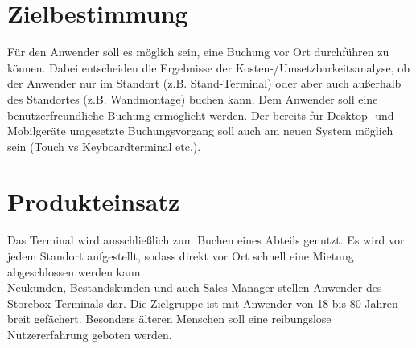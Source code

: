 
\section{Zielbestimmung}
Für den Anwender soll es möglich sein, eine Buchung vor Ort durchführen zu können. Dabei entscheiden die Ergebnisse der Kosten-/Umsetzbarkeitsanalyse, ob der Anwender nur im Standort (z.B. Stand-Terminal) oder aber auch außerhalb des Standortes (z.B. Wandmontage) buchen kann. Dem Anwender soll eine benutzerfreundliche Buchung ermöglicht werden. Der bereits für Desktop- und Mobilgeräte umgesetzte Buchungsvorgang soll auch am neuen System möglich sein (Touch vs Keyboardterminal etc.). 

\section{Produkteinsatz}
Das Terminal wird ausschließlich zum Buchen eines Abteils genutzt. Es wird vor jedem Standort aufgestellt, sodass direkt vor Ort schnell eine Mietung abgeschlossen werden kann.
\\
Neukunden, Bestandskunden und auch Sales-Manager stellen Anwender des Storebox-Terminals dar. Die Zielgruppe ist mit Anwender von 18 bis 80 Jahren breit gefächert. Besonders älteren Menschen soll eine reibungslose Nutzererfahrung geboten werden.